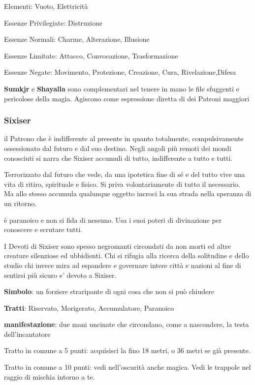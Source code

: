 \documentclass[a4paper,11pt,twoside,openany]{book}
\begin{document}
Elementi: Vuoto, Elettricità

\bigskip

Essenze Privilegiate: Distruzione

Essenze Normali: Charme, Alterazione, Illusione

Essenze Limitate: Attacco, Convocazione, Trasformazione

Essenze Negate: Movimento, Protezione, Creazione, Cura, Rivelazione,Difesa

\textbf{Sumkjr} e \textbf{Shayalla} sono complementari nel tenere in mano le file sfuggenti e pericolose della magia. Agiscono come espressione diretta di dei Patroni maggiori

\subsubsection{Sixiser}

il Patrono che è indifferente al presente in quanto totalmente, compulsivamente ossessionato dal futuro e dal suo destino. Negli angoli più remoti dei mondi conosciuti si narra che Sixiser accumuli di tutto, indifferente a tutto e tutti.

Terrorizzato dal futuro che vede, da una ipotetica fine di sé e del tutto vive una vita di ritiro, spirituale e fisico. Si priva volontariamente di tutto il necessario. Ma allo stesso accumula qualunque oggetto incroci la sua strada nella speranza di un ritorno.

è paranoico e non si fida di nessuno. Usa i suoi poteri di divinazione per conoscere e scrutare tutti.

I Devoti di Sixiser sono spesso negromanti circondati da non morti ed altre creature silenziose ed ubbidienti. Chi si rifugia alla ricerca della solitudine e dello studio chi invece mira ad espandere e governare intere città e nazioni al fine di sentirsi più sicuro e' devoto a Sixiser.

\textbf{Simbolo}: un forziere straripante di ogni cosa che non si può chiudere

\textbf{Tratti}: Riservato, Morigerato, Accumulatore, Paranoico

\textbf{manifestazione}: due mani uncinate che circondano, come a nascondere, la testa dell'incantatore

\bigskip

Tratto in comune a 5 punti: acquisisci la fino 18 metri, o 36 metri se già presente.

Tratto in comune a 10 punti: vedi nell'oscurità anche magica. Vedi le trappole nel raggio di mischia intorno a te.
\end{document}
